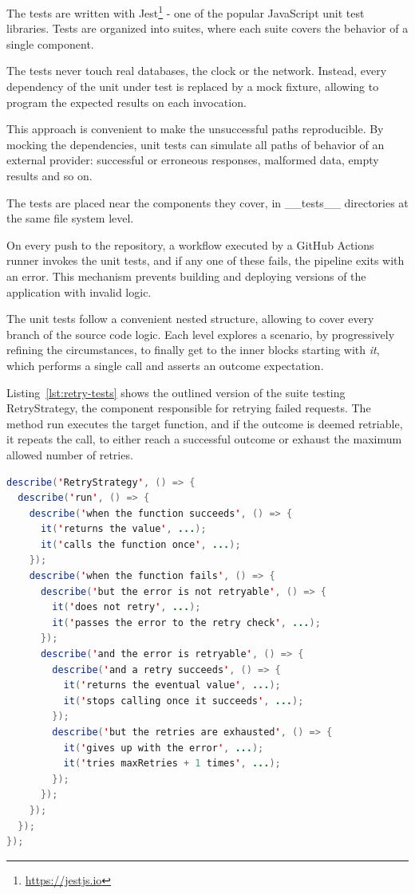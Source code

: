 The tests are written with \textsf{Jest}\footnote{\url{https://jestjs.io}} - one of the popular JavaScript unit test libraries.
Tests are organized into suites, where each suite covers the behavior of a single component.

The tests never touch real databases, the clock or the network.
Instead, every dependency of the unit under test is replaced by a mock fixture, allowing to program the expected results on each invocation.

This approach is convenient to make the unsuccessful paths reproducible.
By mocking the dependencies, unit tests can simulate all paths of behavior of an external provider: successful or erroneous responses, malformed data, empty results and so on.

The tests are placed near the components they cover, in \textsf{\_\_tests\_\_} directories at the same file system level.

On every push to the repository, a workflow executed by a \textsf{GitHub Actions} runner invokes the unit tests, and if any one of these fails, the pipeline exits with an error.
This mechanism prevents building and deploying versions of the application with invalid logic.

The unit tests follow a convenient nested structure, allowing to cover every branch of the source code logic.
Each level explores a scenario, by progressively refining the circumstances, to finally get to the inner blocks starting with \emph{it}, which performs a single call and asserts an outcome expectation.

Listing~\ref{lst:retry-tests} shows the outlined version of the suite testing \textsf{RetryStrategy}, the component responsible for retrying failed requests.
The method \textsf{run} executes the target function, and if the outcome is deemed retriable, it repeats the call, to either reach a successful outcome or exhaust the maximum allowed number of retries.

\begin{lstlisting}[float=tb, language=Java, caption={Structure of the retry strategy unit test suite}, label={lst:retry-tests}]
describe('RetryStrategy', () => {
  describe('run', () => {
    describe('when the function succeeds', () => {
      it('returns the value', ...);
      it('calls the function once', ...);
    });
    describe('when the function fails', () => {
      describe('but the error is not retryable', () => {
        it('does not retry', ...);
        it('passes the error to the retry check', ...);
      });
      describe('and the error is retryable', () => {
        describe('and a retry succeeds', () => {
          it('returns the eventual value', ...);
          it('stops calling once it succeeds', ...);
        });
        describe('but the retries are exhausted', () => {
          it('gives up with the error', ...);
          it('tries maxRetries + 1 times', ...);
        });
      });
    });
  });
});
\end{lstlisting}


